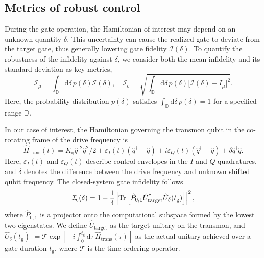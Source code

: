 \documentclass[12pt]{article}
\begin{document}
\subsection{Metrics of robust control}
During the gate operation, the Hamiltonian of interest may depend on an unknown quantity $\delta$. This uncertainty can cause the realized gate to deviate from the target gate, thus generally lowering gate fidelity $\mathcal{I}(\delta)$. To quantify the robustness of the infidelity against $\delta$, we consider both the mean infidelity and its standard deviation as key metrics,
\begin{equation*}
\mathcal{I}_\mu = \int_\mathbb{D} \mathrm{d}\delta\, p(\delta)\mathcal{I}(\delta), \quad
\mathcal{I}_\sigma =\sqrt{\int_\mathbb{D} \mathrm{d}\delta \, p(\delta)\big[\mathcal{I}(\delta)-I_\mu\big]^2 }.
\end{equation*}
Here, the probability distribution $p(\delta)$ satisfies $\int_\mathbb{D}\mathrm{d}\delta \, p(\delta)=1$ for a specified range $\mathbb{D}$. 

In our case of interest, the Hamiltonian governing the transmon qubit in the co-rotating frame of the drive frequency is 
\begin{equation*}
    \hat{H}_\text{trans}(t) = K_\text{q} \hat{q}^{\dagger 2} \hat{q}^2/2 + \varepsilon_I(t)(\hat{q}^\dagger+\hat{q})+i\varepsilon_Q(t)(\hat{q}^\dagger-\hat{q})+\delta \hat{q}^\dagger \hat{q}.
\end{equation*}
Here, $\varepsilon_I(t)$ and $\varepsilon_Q(t)$ describe control envelopes in the $I$ and $Q$ quadratures, and $\delta$ denotes the difference between the drive frequency and unknown shifted qubit frequency. The closed-system gate infidelity follows 
\begin{equation}\label{eq:fid_single}
\mathcal{I}_\text{c}(\delta) = 1-\frac{1}{4}\left|\Tr\left[\hat{P}_{0,1}\hat{U}_\text{target}^\dagger \hat{U}_\delta(t_\text{g})\right]\right|^2,
\end{equation}
where $\hat{P}_{0,1}$ is a projector onto the computational subspace formed by the lowest two eigenstates. We define $\hat{U}_\text{target}$ as the target unitary on the transmon, and $\hat{U}_\delta(t_\text{g})$ $=\mathcal{T}\exp[-i\int_0^{t_\text{g}} \mathrm{d}\tau \, \hat{H}_\text{trans}(\tau)]$ as the actual unitary achieved over a gate duration $t_\text{g}$, where $\mathcal{T}$ is the time-ordering operator. 
\end{document}
